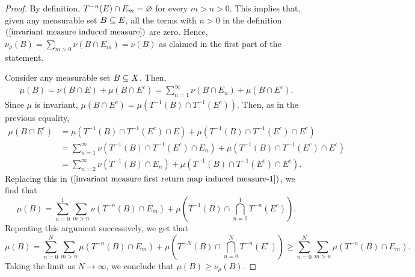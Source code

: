 \begin{proof}
By definition, $T^{-n}(E)\cap E_m=\varnothing$ for every $m>n>0$. This implies that, given any measurable set $B\subseteq E$, all the terms with $n>0$ in the definition $(\ref{invariant measure induced measure})$ are zero. Hence, $\nu_\rho(B)=\sum_{m>0}\nu(B\cap E_m)=\nu(B)$ as claimed in the first part of the statement.\par
Consider any measurable set $B\subseteq X$. Then,
\begin{align}\label{invariant measure first return map induced measure-1}
\mu(B)=\nu(B\cap E)+\mu(B\cap E^c)=\sum_{n=1}^{\infty}\nu(B\cap E_n)+\mu(B\cap E^c).
\end{align}
Since $\mu$ is invariant, $\mu(B\cap E^c)=\mu(T^{-1}(B)\cap T^{-1}(E^c))$. Then, as in the previous equality,
\begin{align*}
\mu(B\cap E^c)&=\mu(T^{-1}(B)\cap T^{-1}(E^c)\cap E)+\mu(T^{-1}(B)\cap T^{-1}(E^c)\cap E^c)\\
&=\sum_{n=1}^{\infty}\nu(T^{-1}(B)\cap T^{-1}(E^c)\cap E_n)+\mu(T^{-1}(B)\cap T^{-1}(E^c)\cap E^c)\\
&=\sum_{n=2}^{\infty}\nu(T^{-1}(B)\cap E_n)+\mu(T^{-1}(B)\cap T^{-1}(E^c)\cap E^c).
\end{align*}
Replacing this in $(\ref{invariant measure first return map induced measure-1})$, we find that
\[\mu(B)=\sum_{n=0}^{1}\sum_{m>n}\nu(T^{-n}(B)\cap E_m)+\mu(T^{-1}(B)\cap\bigcap_{n=0}^{1}T^{-n}(E^c)).\]
Repeating this argument successively, we get that
\[\mu(B)=\sum_{n=0}^{N}\sum_{m>n}\mu(T^{-n}(B)\cap E_m)+\mu(T^{-N}(B)\cap\bigcap_{n=0}^{N}T^{-n}(E^c))\geq\sum_{n=0}^{N}\sum_{m>n}\mu(T^{-n}(B)\cap E_m).\]
Taking the limit as $N\to\infty$, we conclude that $\mu(B)\geq\nu_\rho(B)$.
\end{proof}
